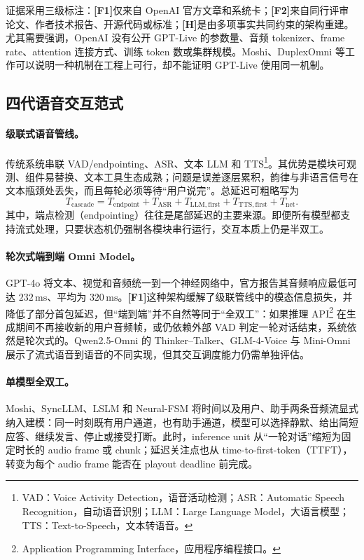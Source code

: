 \documentclass[UTF8,fontset=none,a4paper,10pt]{ctexart}
\newcommand{\FOne}{\textcolor{official}{\textbf{[F1]}}}
\newcommand{\FTwo}{\textcolor{public}{\textbf{[F2]}}}
\newcommand{\Hyp}{\textcolor{hypothesis}{\textbf{[H]}}}
\newcommand{\ms}{\,\mathrm{ms}}
\begin{document}
证据采用三级标注：\FOne 仅来自 OpenAI 官方文章和系统卡；\FTwo 来自同行评审论文、作者技术报告、开源代码或标准；\Hyp 是由多项事实共同约束的架构重建。尤其需要强调，OpenAI 没有公开 GPT-Live 的参数量、音频 tokenizer、frame rate、attention 连接方式、训练 token 数或集群规模。Moshi、DuplexOmni 等工作可以说明一种机制在工程上可行，却不能证明 GPT-Live 使用同一机制。

\subsection{四代语音交互范式}

\paragraph{级联式语音管线。}
传统系统串联 VAD/endpointing、ASR、文本 LLM 和 TTS\footnote{VAD：Voice Activity Detection，语音活动检测；ASR：Automatic Speech Recognition，自动语音识别；LLM：Large Language Model，大语言模型；TTS：Text-to-Speech，文本转语音。}。其优势是模块可观测、组件易替换、文本工具生态成熟；问题是误差逐层累积，韵律与非语言信号在文本瓶颈处丢失，而且每轮必须等待“用户说完”。总延迟可粗略写为
\begin{equation}
T_{\mathrm{cascade}}=T_{\mathrm{endpoint}}+T_{\mathrm{ASR}}+T_{\mathrm{LLM,first}}+T_{\mathrm{TTS,first}}+T_{\mathrm{net}}.
\end{equation}
其中，端点检测（endpointing）往往是尾部延迟的主要来源。即便所有模型都支持流式处理，只要状态机仍强制各模块串行运行，交互本质上仍是半双工。

\paragraph{轮次式端到端 Omni Model。}
GPT-4o 将文本、视觉和音频统一到一个神经网络中，官方报告其音频响应最低可达 $232\ms$、平均为 $320\ms$\cite{openai2024gpt4osystemcard}。\FOne 这种架构缓解了级联管线中的模态信息损失，并降低了部分首包延迟，但“端到端”并不自然等同于“全双工”：如果推理 API\footnote{Application Programming Interface，应用程序编程接口。} 在生成期间不再接收新的用户音频帧，或仍依赖外部 VAD 判定一轮对话结束，系统依然是轮次式的。Qwen2.5-Omni 的 Thinker--Talker、GLM-4-Voice 与 Mini-Omni 展示了流式语音到语音的不同实现\cite{xu2025qwenomni,zeng2024glm4voice,xie2024miniomni}，但其交互调度能力仍需单独评估。

\paragraph{单模型全双工。}
Moshi、SyncLLM、LSLM 和 Neural-FSM 将时间以及用户、助手两条音频流显式纳入建模：同一时刻既有用户通道，也有助手通道，模型可以选择静默、给出简短应答、继续发言、停止或接受打断\cite{defossez2024moshi,veluri2024syncllm,ma2025lslm,wang2024neuralfsm}。此时，inference unit 从“一轮对话”缩短为固定时长的 audio frame 或 chunk；延迟关注点也从 time-to-first-token（TTFT），转变为每个 audio frame 能否在 playout deadline 前完成。
\end{document}
